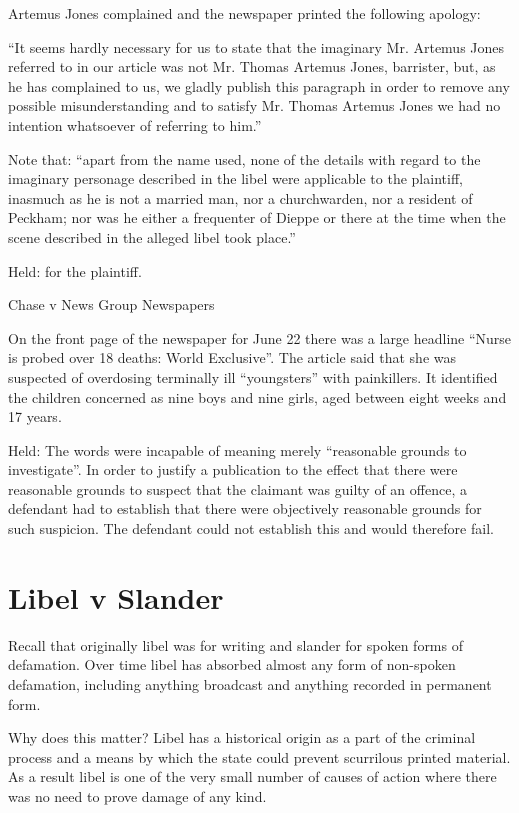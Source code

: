 \documentclass[]{article}
\begin{document}
Artemus Jones complained and the newspaper printed the following
apology:

``It seems hardly necessary for us to state that the imaginary Mr.
Artemus Jones referred to in our article was not Mr. Thomas Artemus
Jones, barrister, but, as he has complained to us, we gladly publish
this paragraph in order to remove any possible misunderstanding and to
satisfy Mr. Thomas Artemus Jones we had no intention whatsoever of
referring to him.''

Note that: ``apart from the name used, none of the details with regard
to the imaginary personage described in the libel were applicable to the
plaintiff, inasmuch as he is not a married man, nor a churchwarden, nor
a resident of Peckham; nor was he either a frequenter of Dieppe or there
at the time when the scene described in the alleged libel took place.''

Held: for the plaintiff.

Chase v News Group Newspapers

On the front page of the newspaper for June 22 there was a large
headline ``Nurse is probed over 18 deaths: World Exclusive''. The
article said that she was suspected of overdosing terminally ill
``youngsters'' with painkillers. It identified the children concerned as
nine boys and nine girls, aged between eight weeks and 17 years.

Held: The words were incapable of meaning merely ``reasonable grounds to
investigate''. In order to justify a publication to the effect that
there were reasonable grounds to suspect that the claimant was guilty of
an offence, a defendant had to establish that there were objectively
reasonable grounds for such suspicion. The defendant could not establish
this and would therefore fail.

\section{Libel v Slander}
\label{sec:app-libelvslander}

Recall that originally libel was for writing and slander for spoken forms of defamation. Over time libel has absorbed almost any form of non-spoken defamation, including anything broadcast and anything recorded in permanent form.

Why does this matter? Libel has a historical origin as a part of the
criminal process and a means by which the state could prevent scurrilous
printed material. As a result libel is one of the very small number of
causes of action where there was no need to prove damage of any kind.
\end{document}
